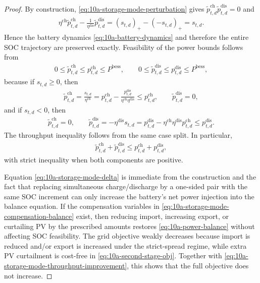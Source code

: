 \begin{proof}
By construction, \eqref{eq:10a-storage-mode-perturbation} gives \(\widetilde p^{\mathrm{ch}}_{t,d}\widetilde p^{\mathrm{dis}}_{t,d}=0\) and
\begin{align}
\eta^{\mathrm{ch}}\widetilde p^{\mathrm{ch}}_{t,d} - \frac{1}{\eta^{\mathrm{dis}}}\widetilde p^{\mathrm{dis}}_{t,d}
= (s_{t,d})_+ - (-s_{t,d})_+
= s_{t,d}.
\end{align}
Hence the battery dynamics \eqref{eq:10a-battery-dynamics} and therefore the entire SOC trajectory are preserved exactly. Feasibility of the power bounds follows from
\begin{align}
0 \le \widetilde p^{\mathrm{ch}}_{t,d} \le p^{\mathrm{ch}}_{t,d} \le P^{\mathrm{bess}},
\qquad
0 \le \widetilde p^{\mathrm{dis}}_{t,d} \le p^{\mathrm{dis}}_{t,d} \le P^{\mathrm{bess}},
\end{align}
because if \(s_{t,d}\ge 0\), then
\begin{align}
\widetilde p^{\mathrm{ch}}_{t,d} = \frac{s_{t,d}}{\eta^{\mathrm{ch}}} = p^{\mathrm{ch}}_{t,d} - \frac{p^{\mathrm{dis}}_{t,d}}{\eta^{\mathrm{ch}}\eta^{\mathrm{dis}}} \le p^{\mathrm{ch}}_{t,d},
\qquad
\widetilde p^{\mathrm{dis}}_{t,d}=0,
\end{align}
and if \(s_{t,d}<0\), then
\begin{align}
\widetilde p^{\mathrm{ch}}_{t,d}=0,
\qquad
\widetilde p^{\mathrm{dis}}_{t,d} = -\eta^{\mathrm{dis}} s_{t,d} = p^{\mathrm{dis}}_{t,d} - \eta^{\mathrm{ch}}\eta^{\mathrm{dis}} p^{\mathrm{ch}}_{t,d} \le p^{\mathrm{dis}}_{t,d}.
\end{align}
The throughput inequality follows from the same case split. In particular,
\begin{align}
\widetilde p^{\mathrm{ch}}_{t,d}+\widetilde p^{\mathrm{dis}}_{t,d} \le p^{\mathrm{ch}}_{t,d}+p^{\mathrm{dis}}_{t,d},
\end{align}
with strict inequality when both components are positive.

Equation \eqref{eq:10a-storage-mode-delta} is immediate from the construction and the fact that replacing simultaneous charge/discharge by a one-sided pair with the same SOC increment can only increase the battery's net power injection into the balance equation. If the compensation variables in \eqref{eq:10a-storage-mode-compensation-balance} exist, then reducing import, increasing export, or curtailing PV by the prescribed amounts restores \eqref{eq:10a-power-balance} without affecting SOC feasibility. The grid objective weakly decreases because import is reduced and/or export is increased under the strict-spread regime, while extra PV curtailment is cost-free in \eqref{eq:10a-second-stage-obj}. Together with \eqref{eq:10a-storage-mode-throughput-improvement}, this shows that the full objective does not increase.
\end{proof}

